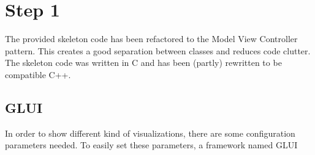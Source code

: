 \section*{Step 1}
    The provided skeleton code has been refactored to the Model View Controller pattern. This creates a good separation between classes and reduces code clutter.
    The skeleton code was written in C and has been (partly) rewritten to be compatible C++.

    \subsection*{GLUI}
        In order to show different kind of visualizations, there are some configuration parameters needed. To easily set these parameters, a framework named GLUI \cite{glui}